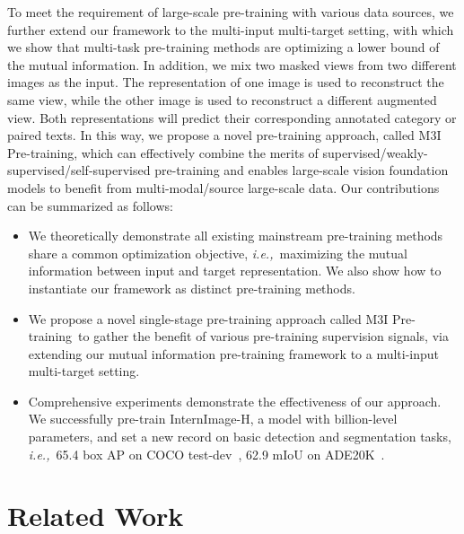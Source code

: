 \documentclass[10pt,twocolumn,letterpaper]{article}
\def\ie{\textit{i.e.,~}}
\def\name{M3I Pre-training}
\begin{document}
To meet the requirement of large-scale pre-training with various data sources, we further extend our framework to the multi-input multi-target setting, with which we show that multi-task pre-training methods are optimizing a lower bound of the mutual information. 
In addition, we mix two masked views from two different images as the input. The representation of one image is used to reconstruct the same view, while the other image is used to reconstruct a different augmented view. Both representations will predict their corresponding annotated category or paired texts.
In this way, we propose a novel pre-training approach, called \name{}, which can effectively combine the merits of supervised/weakly-supervised/self-supervised pre-training and enables large-scale vision foundation models to benefit from multi-modal/source large-scale data. Our contributions can be summarized as follows:
\begin{itemize}[leftmargin=1em]
    \vspace{-0.5em}
    \item We theoretically demonstrate all existing mainstream pre-training methods share a common optimization objective, \ie maximizing the mutual information between input and target representation. We also show how to instantiate our framework as distinct pre-training methods.    
    \item We propose a novel single-stage pre-training approach called \name\ to gather the benefit of various pre-training supervision signals, via extending our mutual information pre-training framework to a multi-input multi-target setting.
    \item Comprehensive experiments demonstrate the effectiveness of our approach. We successfully pre-train InternImage-H\cite{anonymous2022internimg}, a model with billion-level parameters, and set a new record on basic detection and segmentation tasks, \ie 65.4 box AP on COCO test-dev~\cite{lin2014microsoft}, 62.9 mIoU on ADE20K~\cite{zhou2019semantic}.
\end{itemize}

 \section{Related Work}
\label{sec:related}
\end{document}
